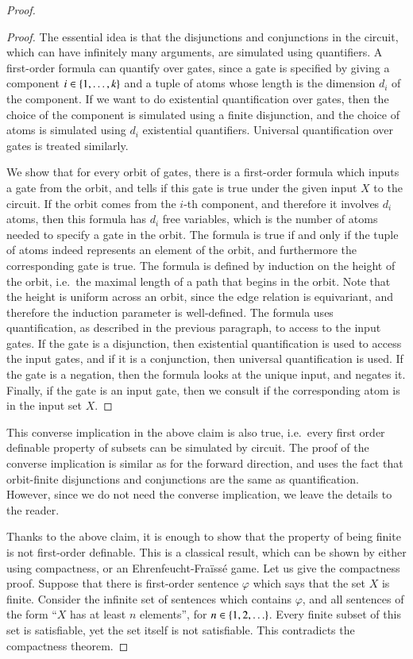 \begin{proof}
\begin{proof}
		The essential idea is that the disjunctions and conjunctions in the circuit, which can have infinitely many arguments, are simulated using quantifiers. 
		A first-order formula can quantify over gates, since a gate is specified by giving a component $i \in \{1,\ldots,k\}$ and a tuple of atoms whose length is the dimension $d_i$ of the component. If we want to do existential quantification over gates, then the choice of the component is simulated using a finite disjunction, and the choice of atoms is simulated using $d_i$ existential quantifiers. Universal quantification over gates is treated similarly. 

		We show that for every orbit of gates, there is a first-order formula which inputs a gate from the orbit, and tells  if this gate is true under the given input $X$ to the circuit. If the orbit comes from the $i$-th component, and therefore it involves $d_i$ atoms, then this formula has $d_i$ free variables, which is the number of atoms needed to specify a gate in the orbit. The formula is true if and only if the tuple of atoms indeed represents an element of the orbit, and furthermore the corresponding gate is true.  The formula is defined by induction on the height of the orbit, i.e.~the maximal length of a path that begins in the orbit. Note that the height is uniform across an orbit, since the edge relation is equivariant, and therefore the induction parameter is well-defined. The formula uses quantification, as described in the previous paragraph, to access to the input gates. If the gate is a disjunction, then existential quantification is used to access the input gates, and if it is a conjunction, then universal quantification is used. If the gate is a negation, then the formula looks at the unique input, and negates it. Finally, if the gate is an input gate, then we consult if the corresponding atom is in the input set $X$.
	\end{proof}

	This converse implication in the above claim is also true, i.e.~every first order definable property of subsets can be simulated by circuit. The proof of the converse implication is similar as for the forward direction, and uses the fact that orbit-finite disjunctions and conjunctions are the same as quantification. However, since we do not need the converse implication, we leave the details to the reader.

	Thanks to the above claim, it is enough to show that the property of being finite is not first-order definable. This is a classical result, which can be shown by either using compactness, or an Ehrenfeucht-Fraïssé game. Let us give the compactness proof. Suppose that there is first-order sentence $\varphi$ which says that the set $X$ is finite. Consider the infinite set of sentences which contains $\varphi$, and all sentences of the form ``$X$ has at least  $n$ elements'', for  $n \in \{1,2,\ldots\}$. Every finite subset of this set is satisfiable, yet the set itself is not satisfiable. This contradicts the compactness theorem.
\end{proof}


